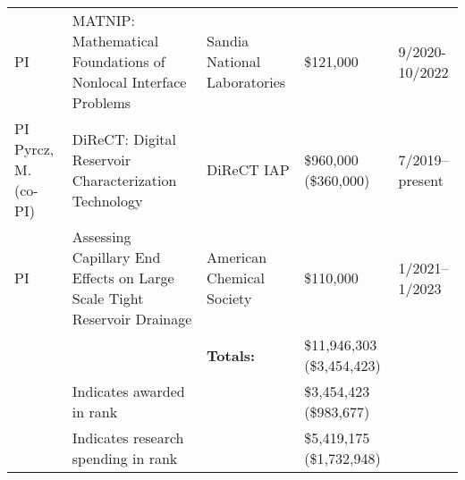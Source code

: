 {\begin{center}
\begin{longtable}{p{1.7cm}p{6.5cm}p{3cm}P{1.5cm}p{1.0cm}}
      PI & MATNIP: Mathematical Foundations of Nonlocal Interface Problems & Sandia National Laboratories &  \$121,000 & 9/2020-10/2022 \\
      PI \newline Pyrcz, \newline M. (co-PI) & DiReCT: Digital Reservoir Characterization Technology & DiReCT IAP & \$960,000 \newline (\$360,000) & 7/2019--present \\
      PI & Assessing Capillary End Effects on Large Scale Tight Reservoir Drainage &  American Chemical Society &  \$110,000 & 1/2021--1/2023 \\
      \midrule
      {} & {} & \textbf{Totals:} & \$11,946,303 \newline (\$3,454,423) & {} \\
         & Indicates awarded in rank & {} & \$3,454,423 \newline (\$983,677) & \\
         & Indicates research spending in rank &  {} & \$5,419,175 \newline (\$1,732,948)  & \\
      \bottomrule
    \end{longtable}
  \end{center}
}
\else
\ifdefined\ispdf
